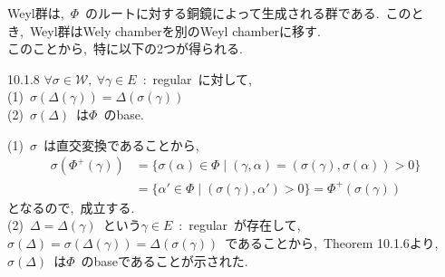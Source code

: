 \documentclass[uplatex,dvipdfmx]{jsarticle}
\begin{document}
Weyl群は,~$\Phi$~のルートに対する銅鏡によって生成される群である.~このとき,~Weyl群はWely chamberを別のWeyl chamberに移す.~\\
このことから,~特に以下の2つが得られる.\\
\begin{mylemma}{10.1.8}
    $\forall \sigma \in \mathcal{W},~\forall \gamma \in E$~:~regular~に対して,~\\
    (1)~$\sigma(\Delta(\gamma)) = \Delta(\sigma(\gamma))$\\
    (2)~$\sigma(\Delta)$~は$\Phi$~のbase.
\end{mylemma}
\begin{myproof}
    (1)~$\sigma$~は直交変換であることから,~
    \begin{equation*}
        \begin{split}
            \sigma(\Phi^+(\gamma)) &= \{ \sigma(\alpha) \in \Phi \mid (\gamma,\alpha) = (\sigma(\gamma), \sigma(\alpha)) > 0 \} \\
            &= \{ \alpha' \in \Phi \mid (\sigma(\gamma), \alpha') > 0 \} = \Phi^+(\sigma(\gamma))
        \end{split}
    \end{equation*}
    となるので,~成立する.\\
    (2)~$\Delta = \Delta(\gamma)$~という$\gamma \in E$~:~regular~が存在して,~$\sigma(\Delta) = \sigma(\Delta(\gamma)) = \Delta(\sigma(\gamma))$~であることから,~Theorem 10.1.6より,~$\sigma(\Delta)$~は$\Phi$~のbaseであることが示された.
\end{myproof}
\newpage
\end{document}
